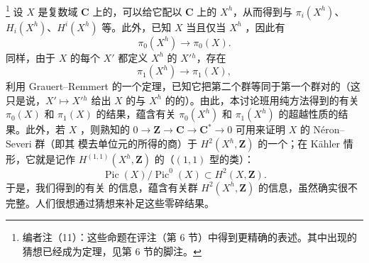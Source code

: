 \footnote{编者注（11）：这些命题在评注（第 6 节）中得到更精确的表述。其中出现的猜想已经成为定理，见第 6 节的脚注。}
设 $X$ 是复数域 $\mathbf C$ 上的，可以给它配以 $\mathbf C$ 上的 $X^h$，从而得到与 $\pi_i(X^h)$、$H_i(X^h)$、$H^i(X^h)$ 等。此外，已知 $X$ 当且仅当 $X^h$ ，因此有
\[
\pi_0(X^h)\longrightarrow\pi_0(X).
\]
同样，由于 $X$ 的每个 $X'$ 都定义 $X^h$ 的 $X'{}^h$，存在
\[
\pi_1(X^h)\longrightarrow\pi_1(X),
\]
利用 Grauert--Remmert 的一个定理，已知它把第二个群等同于第一个群对的（这只是说，$X'\mapsto X'{}^h$ 给出 $X$ 的与 $X^h$ 的的）。由此，本讨论班用纯方法得到的有关 $\pi_0(X)$ 和 $\pi_1(X)$ 的结果，蕴含有关 $\pi_0(X^h)$ 和 $\pi_1(X^h)$ 的超越性质的结果。此外，若 $X$ ，则熟知的 $0\to\mathbf Z\to\mathbf C\to\mathbf C^*\to0$ 可用来证明 $X$ 的 Néron--Severi 群（即其 模去单位元的所得的商）于 $H^2(X^h,\mathbf Z)$ 的一个；在 Kähler 情形，它就是记作 $H^{(1,1)}(X^h,\mathbf Z)$ 的（$(1,1)$ 型的类）：
\[
\operatorname{Pic}(X)/\operatorname{Pic}^0(X)\subset H^2(X,\mathbf Z).
\]
于是，我们得到的有关 的信息，蕴含有关群 $H^2(X^h,\mathbf Z)$ 的信息，虽然确实很不完整。人们很想通过猜想来补足这些零碎结果。

